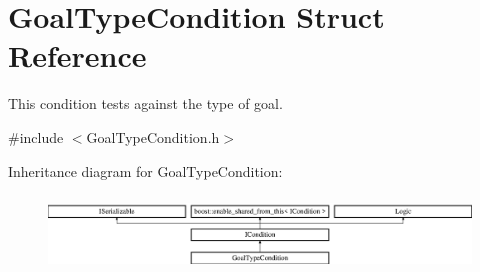 \hypertarget{struct_goal_type_condition}{}\section{Goal\+Type\+Condition Struct Reference}
\label{struct_goal_type_condition}


This condition tests against the type of goal.  




{\ttfamily \#include $<$Goal\+Type\+Condition.\+h$>$}

Inheritance diagram for Goal\+Type\+Condition\+:\begin{figure}[H]
\begin{center}
\leavevmode
\includegraphics[height=2.014389cm]{struct_goal_type_condition}
\end{center}
\end{figure}
